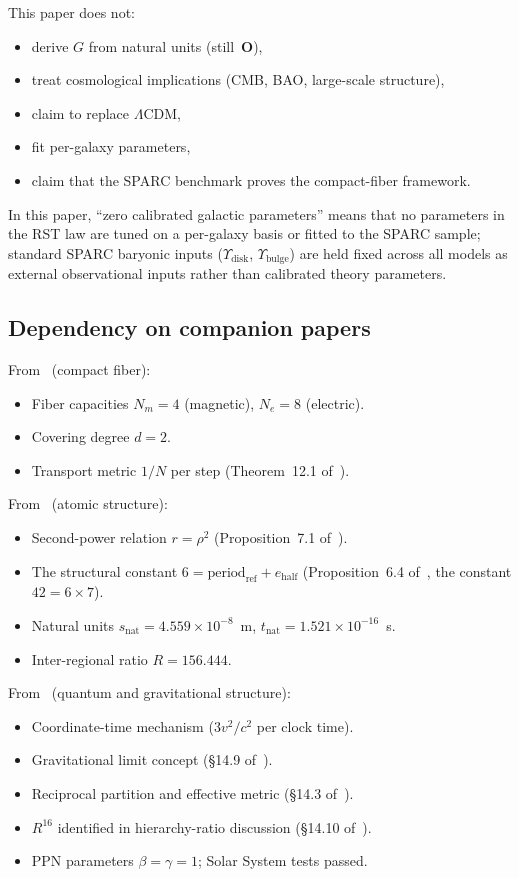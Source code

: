\documentclass[11pt,a4paper]{article}
\begin{document}
This paper does not:
\begin{itemize}
\item derive $G$ from natural units (still~\textbf{O}),
\item treat cosmological implications (CMB, BAO, large-scale structure),
\item claim to replace $\Lambda$CDM,
\item fit per-galaxy parameters,
\item claim that the SPARC benchmark proves the compact-fiber framework.
\end{itemize}

\noindent In this paper, ``zero calibrated galactic parameters'' means that no parameters in the RST law are tuned on a per-galaxy basis or fitted to the SPARC sample; standard SPARC baryonic inputs ($\Upsilon_{\mathrm{disk}}$, $\Upsilon_{\mathrm{bulge}}$) are held fixed across all models as external observational inputs rather than calibrated theory parameters.

\subsection{Dependency on companion papers}
\label{sec:dependency}

From~\cite{Wells2026a} (compact fiber):
\begin{itemize}
\item Fiber capacities $N_m = 4$ (magnetic), $N_e = 8$ (electric).
\item Covering degree $d = 2$.
\item Transport metric $1/N$ per step (Theorem~12.1 of~\cite{Wells2026a}).
\end{itemize}

From~\cite{Wells2026b} (atomic structure):
\begin{itemize}
\item Second-power relation $r = \rho^2$ (Proposition~7.1 of~\cite{Wells2026b}).
\item The structural constant $6 = \mathrm{period}_{\mathrm{ref}} + e_{\mathrm{half}}$ (Proposition~6.4 of~\cite{Wells2026b}, the constant $42 = 6 \times 7$).
\item Natural units $s_{\mathrm{nat}} = 4.559 \times 10^{-8}$~m, $t_{\mathrm{nat}} = 1.521 \times 10^{-16}$~s.
\item Inter-regional ratio $R = 156.444$.
\end{itemize}

From~\cite{Wells2026c} (quantum and gravitational structure):
\begin{itemize}
\item Coordinate-time mechanism ($3v^2/c^2$ per clock time).
\item Gravitational limit concept (\S14.9 of~\cite{Wells2026c}).
\item Reciprocal partition and effective metric (\S14.3 of~\cite{Wells2026c}).
\item $R^{16}$ identified in hierarchy-ratio discussion (\S14.10 of~\cite{Wells2026c}).
\item PPN parameters $\beta = \gamma = 1$; Solar System tests passed.
\end{itemize}
\end{document}
